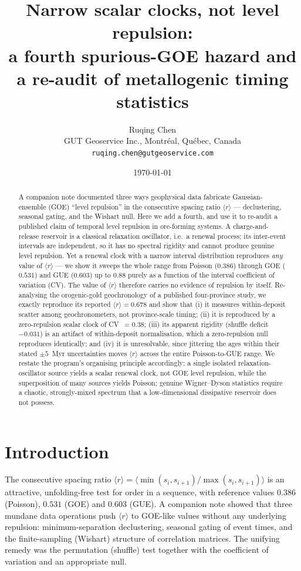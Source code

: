 \documentclass[11pt]{article}
\title{\bfseries Narrow scalar clocks, not level repulsion:\\
a fourth spurious-GOE hazard and a re-audit of metallogenic timing statistics}
\author{Ruqing Chen\\[2pt]
\small GUT Geoservice Inc., Montr\'eal, Qu\'ebec, Canada\\
\small \texttt{ruqing.chen@gutgeoservice.com}}
\date{\today}
\newcommand{\rr}{\langle r\rangle}
\begin{document}
\maketitle

\begin{abstract}
\noindent
A companion note documented three ways geophysical data fabricate Gaussian-ensemble
(GOE) ``level repulsion'' in the consecutive spacing ratio $\rr$ --- declustering,
seasonal gating, and the Wishart null. Here we add a fourth, and use it to
re-audit a published claim of temporal level repulsion in ore-forming systems. A
charge-and-release reservoir is a classical relaxation oscillator, i.e.\ a renewal
process; its inter-event intervals are independent, so it has no spectral rigidity
and cannot produce genuine level repulsion. Yet a renewal clock with a narrow
interval distribution reproduces \emph{any} value of $\rr$ --- we show it sweeps
the whole range from Poisson ($0.386$) through GOE ($0.531$) and GUE ($0.603$) up
to $0.88$ purely as a function of the interval coefficient of variation (CV). The
value of $\rr$ therefore carries no evidence of repulsion by itself. Re-analysing
the orogenic-gold geochronology of a published four-province study, we exactly
reproduce its reported $\rr=0.678$ and show that (i) it measures within-deposit
scatter among geochronometers, not province-scale timing; (ii) it is reproduced
by a zero-repulsion scalar clock of CV~$=0.38$; (iii) its apparent rigidity
(shuffle deficit $-0.031$) is an artifact of within-deposit normalisation, which a
zero-repulsion null reproduces identically; and (iv) it is unresolvable, since
jittering the ages within their stated $\pm5$~Myr uncertainties moves $\rr$ across
the entire Poisson-to-GUE range. We restate the program's organising principle
accordingly: a single isolated relaxation-oscillator source yields a scalar
renewal clock, not GOE level repulsion, while the superposition of many sources
yields Poisson; genuine Wigner--Dyson statistics require a chaotic, strongly-mixed
spectrum that a low-dimensional dissipative reservoir does not possess.
\end{abstract}

\section{Introduction}

The consecutive spacing ratio $\rr=\langle\min(s_i,s_{i+1})/\max(s_i,s_{i+1})\rangle$
\citep{oganesyan2007,atas2013} is an attractive, unfolding-free test for order in
a sequence, with reference values $0.386$ (Poisson), $0.531$ (GOE) and $0.603$
(GUE). A companion note \citep{chen2026spurious} showed that three mundane data
operations push $\rr$ to GOE-like values without any underlying repulsion:
minimum-separation declustering, seasonal gating of event times, and the
finite-sampling (Wishart) structure of correlation matrices. The unifying remedy
was the permutation (shuffle) test together with the coefficient of variation and
an appropriate null.
\end{document}
